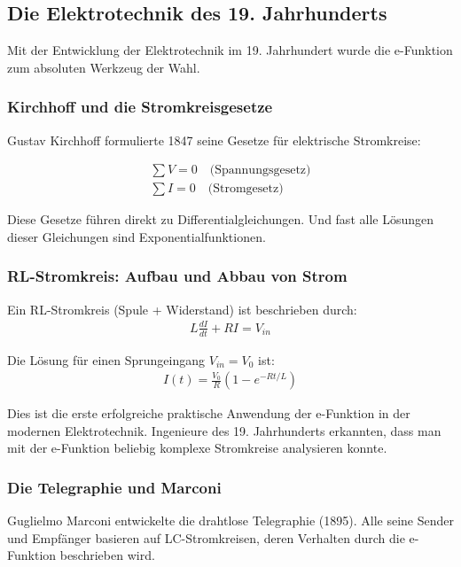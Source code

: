\documentclass[a4paper,12pt,twoside]{report}
\theoremstyle{definition}
\begin{document}
\subsection{Die Elektrotechnik des 19. Jahrhunderts}

Mit der Entwicklung der Elektrotechnik im 19. Jahrhundert wurde die e-Funktion zum absoluten Werkzeug der Wahl.

\subsubsection*{Kirchhoff und die Stromkreisgesetze}

Gustav Kirchhoff formulierte 1847 seine Gesetze für elektrische Stromkreise:

\begin{align}
	\sum V = 0 \quad \text{(Spannungsgesetz)}\\
	\sum I = 0 \quad \text{(Stromgesetz)}
\end{align}

Diese Gesetze führen direkt zu Differentialgleichungen. Und fast alle Lösungen dieser Gleichungen sind Exponentialfunktionen.

\subsubsection*{RL-Stromkreis: Aufbau und Abbau von Strom}

Ein RL-Stromkreis (Spule + Widerstand) ist beschrieben durch:
\begin{align}
	L \frac{dI}{dt} + R I = V_{in}
\end{align}

Die Lösung für einen Sprungeingang $V_{in} = V_0$ ist:
\begin{align}
	I(t) = \frac{V_0}{R} (1 - e^{-Rt/L})
\end{align}

Dies ist die erste erfolgreiche praktische Anwendung der e-Funktion in der modernen Elektrotechnik. Ingenieure des 19. Jahrhunderts erkannten, dass man mit der e-Funktion beliebig komplexe Stromkreise analysieren konnte.

\subsubsection*{Die Telegraphie und Marconi}

Guglielmo Marconi entwickelte die drahtlose Telegraphie (1895). Alle seine Sender und Empfänger basieren auf LC-Stromkreisen, deren Verhalten durch die e-Funktion beschrieben wird.
\end{document}

